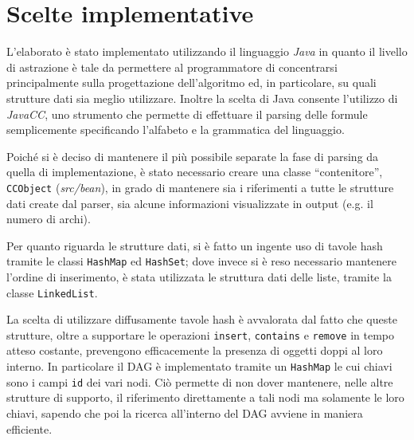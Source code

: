 \documentclass[a4paper,11pt]{article}
\begin{document}
\section{Scelte implementative}
L'elaborato è stato implementato utilizzando il linguaggio \emph{Java} 
in quanto il livello di astrazione è tale da permettere al programmatore 
di concentrarsi principalmente sulla progettazione dell'algoritmo ed, in 
particolare, su quali strutture dati sia meglio utilizzare. 
Inoltre la scelta di Java consente l'utilizzo di \emph{JavaCC}, uno 
strumento che permette di effettuare il parsing delle formule 
semplicemente specificando l'alfabeto e la grammatica del linguaggio.\par
Poiché si è deciso di mantenere il più possibile separate la fase di 
parsing da quella di implementazione, è 
stato necessario creare una classe “contenitore”, \texttt{CCObject} 
(\emph{src/bean}), in grado di mantenere sia i riferimenti a tutte le 
strutture dati create dal parser, sia alcune informazioni visualizzate 
in output (e.g. il numero di archi).\par
Per quanto riguarda le strutture dati, si è fatto un ingente uso di tavole 
hash tramite le classi \texttt{HashMap} ed \texttt{HashSet}; dove invece
si è reso necessario mantenere l'ordine di inserimento, è stata utilizzata le 
struttura dati delle liste, tramite la classe \texttt{LinkedList}.\par
La scelta di utilizzare diffusamente tavole hash è avvalorata dal 
fatto che queste strutture, oltre a supportare le operazioni 
\texttt{insert}, \texttt{contains} e \texttt{remove} in tempo atteso 
costante, prevengono efficacemente la presenza di oggetti doppi al loro interno.
In particolare il DAG è implementato tramite un \texttt{HashMap} le 
cui chiavi sono i campi \texttt{id} dei vari nodi.
Ciò permette di non dover mantenere, nelle altre strutture di supporto, 
il riferimento direttamente a tali nodi ma solamente le loro chiavi, sapendo 
che poi la ricerca all'interno del DAG avviene in maniera efficiente.
\end{document}
